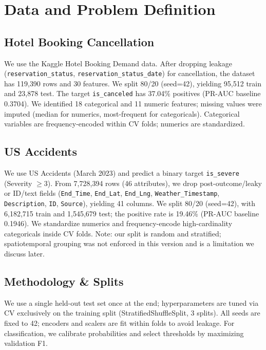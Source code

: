 \documentclass[conference]{IEEEtran}
\newcommand{\datasetA}{Hotel Booking Cancellation}
\newcommand{\datasetB}{US Accidents}
\newcommand{\seed}{42}
\begin{document}
\section{Data and Problem Definition}
\subsection{\datasetA}
We use the Kaggle Hotel Booking Demand data. After dropping leakage (\texttt{reservation\_status}, \texttt{reservation\_status\_date}) for cancellation, the dataset has 119{,}390 rows and 30 features. We split 80/20 (seed=\seed), yielding 95{,}512 train and 23{,}878 test. The target \texttt{is\_canceled} has 37.04\% positives (PR-AUC baseline 0.3704). We identified 18 categorical and 11 numeric features; missing values were imputed (median for numerics, most-frequent for categoricals). Categorical variables are frequency-encoded within CV folds; numerics are standardized.

\subsection{\datasetB}
We use US Accidents (March 2023) and predict a binary target \texttt{is\_severe} (Severity $\geq 3$). From 7{,}728{,}394 rows (46 attributes), we drop post-outcome/leaky or ID/text fields (\texttt{End\_Time}, \texttt{End\_Lat}, \texttt{End\_Lng}, \texttt{Weather\_Timestamp}, \texttt{Description}, \texttt{ID}, \texttt{Source}), yielding 41 columns. We split 80/20 (seed=\seed), with 6{,}182{,}715 train and 1{,}545{,}679 test; the positive rate is 19.46\% (PR-AUC baseline 0.1946). We standardize numerics and frequency-encode high-cardinality categoricals inside CV folds. Note: our split is random and stratified; spatiotemporal grouping was not enforced in this version and is a limitation we discuss later.

\subsection{Methodology \& Splits}
We use a single held-out test set once at the end; hyperparameters are tuned via CV exclusively on the training split (StratifiedShuffleSplit, 3 splits). All seeds are fixed to \seed{}; encoders and scalers are fit within folds to avoid leakage. For classification, we calibrate probabilities and select thresholds by maximizing validation F1.
\end{document}
